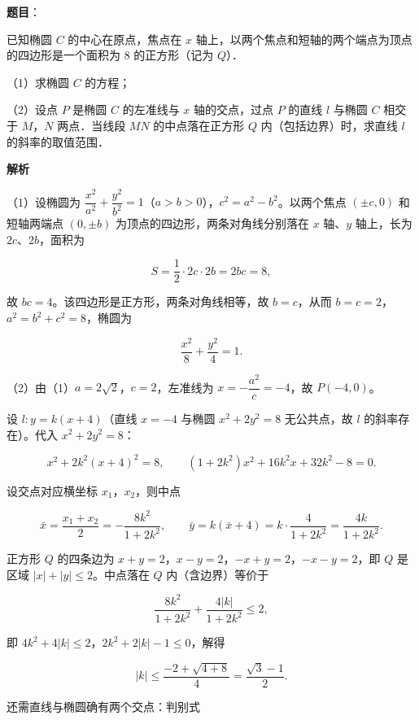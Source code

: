 \begin{answer}

\textbf{题目}：

已知椭圆 $C$ 的中心在原点，焦点在 $x$ 轴上，以两个焦点和短轴的两个端点为顶点的四边形是一个面积为 $8$ 的正方形（记为 $Q$）．

（1）求椭圆 $C$ 的方程；

（2）设点 $P$ 是椭圆 $C$ 的左准线与 $x$ 轴的交点，过点 $P$ 的直线 $l$ 与椭圆 $C$ 相交于 $M$，$N$ 两点．当线段 $MN$ 的中点落在正方形 $Q$ 内（包括边界）时，求直线 $l$ 的斜率的取值范围．

\textbf{解析}

（1）设椭圆为 $\dfrac{x^2}{a^2}+\dfrac{y^2}{b^2}=1$（$a>b>0$），$c^2=a^2-b^2$。以两个焦点 $(\pm c,0)$ 和短轴两端点 $(0,\pm b)$ 为顶点的四边形，两条对角线分别落在 $x$ 轴、$y$ 轴上，长为 $2c$、$2b$，面积为

\nopagebreak[4]
\[S=\frac12\cdot2c\cdot2b=2bc=8,\]

故 $bc=4$。该四边形是正方形，两条对角线相等，故 $b=c$，从而 $b=c=2$，$a^2=b^2+c^2=8$，椭圆为

\nopagebreak[4]
\[\frac{x^2}{8}+\frac{y^2}{4}=1.\]

（2）由（1）$a=2\sqrt2$，$c=2$，左准线为 $x=-\dfrac{a^2}{c}=-4$，故 $P(-4,0)$。

设 $l:y=k(x+4)$（直线 $x=-4$ 与椭圆 $x^2+2y^2=8$ 无公共点，故 $l$ 的斜率存在）。代入 $x^2+2y^2=8$：

\nopagebreak[4]
\[x^2+2k^2(x+4)^2=8,\qquad (1+2k^2)x^2+16k^2x+32k^2-8=0.\]

设交点对应横坐标 $x_1$，$x_2$，则中点

\nopagebreak[4]
\[\bar x=\frac{x_1+x_2}{2}=-\frac{8k^2}{1+2k^2},\qquad \bar y=k(\bar x+4)=k\cdot\frac{4}{1+2k^2}=\frac{4k}{1+2k^2}.\]

正方形 $Q$ 的四条边为 $x+y=2$，$x-y=2$，$-x+y=2$，$-x-y=2$，即 $Q$ 是区域 $|x|+|y|\leqslant2$。中点落在 $Q$ 内（含边界）等价于

\nopagebreak[4]
\[\frac{8k^2}{1+2k^2}+\frac{4|k|}{1+2k^2}\leqslant2,\]

即 $4k^2+4|k|\leqslant2$，$2k^2+2|k|-1\leqslant0$，解得

\nopagebreak[4]
\[|k|\leqslant\frac{-2+\sqrt{4+8}}{4}=\frac{\sqrt3-1}{2}.\]

还需直线与椭圆确有两个交点：判别式


\end{answer}
